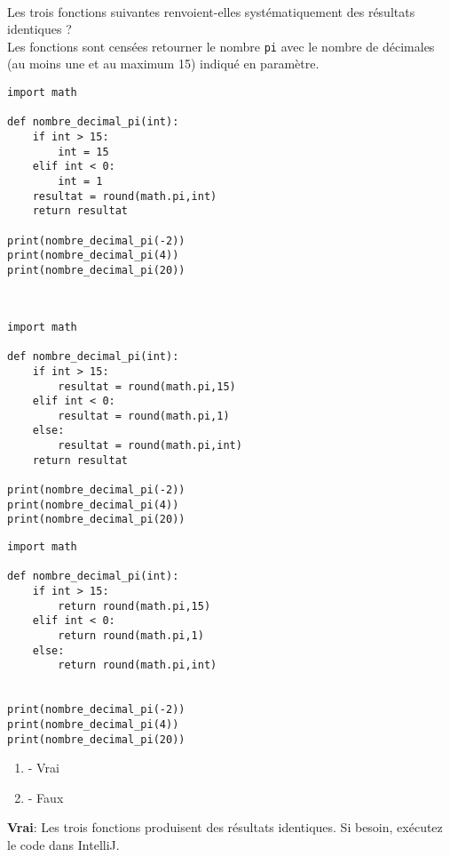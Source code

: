 \begin{Exercice}[5 minutes]\\
Les trois fonctions suivantes renvoient-elles systématiquement des résultats identiques ?\\Les fonctions sont censées retourner le nombre \lstinline{pi} avec le nombre de décimales (au moins une et au maximum 15) indiqué en paramètre.
\begin{multicols}{3}
\begin{lstlisting}
import math

def nombre_decimal_pi(int):
    if int > 15:
        int = 15
    elif int < 0:
        int = 1
    resultat = round(math.pi,int) 
    return resultat

print(nombre_decimal_pi(-2))
print(nombre_decimal_pi(4))
print(nombre_decimal_pi(20))



\end{lstlisting}
\columnbreak

\begin{lstlisting}
import math

def nombre_decimal_pi(int):
    if int > 15:
        resultat = round(math.pi,15)
    elif int < 0:
        resultat = round(math.pi,1)
    else: 
        resultat = round(math.pi,int)
    return resultat

print(nombre_decimal_pi(-2))
print(nombre_decimal_pi(4))
print(nombre_decimal_pi(20))

\end{lstlisting}
\columnbreak

\begin{lstlisting}
import math

def nombre_decimal_pi(int):
    if int > 15:
        return round(math.pi,15)
    elif int < 0:
        return round(math.pi,1)
    else: 
        return round(math.pi,int)
    

print(nombre_decimal_pi(-2))
print(nombre_decimal_pi(4))
print(nombre_decimal_pi(20))

\end{lstlisting}
\end{multicols}

\begin{enumerate}
    \item - Vrai
    \item - Faux
\end{enumerate}
\begin{solution}
    \textbf{Vrai}: Les trois fonctions produisent des résultats identiques. Si besoin, exécutez le code dans IntelliJ.
\end{solution}
\end{Exercice}
